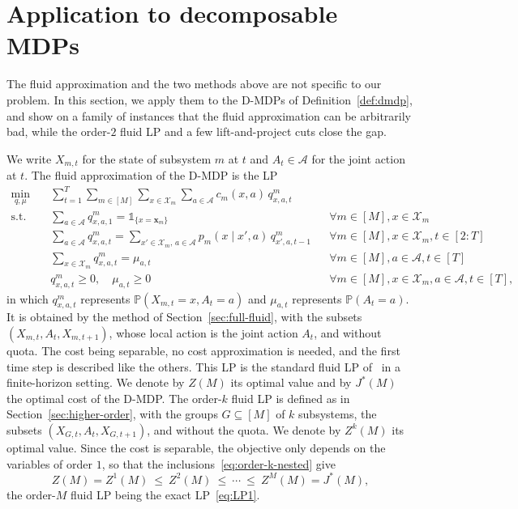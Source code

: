 \documentclass{article}
\begin{document}
\section{Application to decomposable MDPs}
\label{sec:dmdp}
The fluid approximation and the two methods above are not specific to our problem. In this section, we apply them to
the D-MDPs of Definition~\ref{def:dmdp}, and show on a family of instances that the fluid approximation can be
arbitrarily bad, while the order-$2$ fluid LP and a few lift-and-project cuts close the gap.

We write $X_{m,t}$ for the state of subsystem $m$ at $t$ and $A_t \in \mathcal{A}$ for the joint action at $t$. The
fluid approximation of the D-MDP is the LP
\begin{subequations}\label{eq:dmdp-fluid}
\begin{align}
\min_{q,\mu} \quad
& \sum_{t=1}^{T} \sum_{m \in [M]} \sum_{x \in \mathcal{X}_m} \sum_{a \in \mathcal{A}} c_m(x,a)\, q^m_{x,a,t}
\label{eq:dmdp-fluid-obj}\\
\text{s.t.} \quad
& \sum_{a \in \mathcal{A}} q^m_{x,a,1} = \mathds{1}_{\{x = \mathbf{x}_m\}}
&& \forall m \in [M], x \in \mathcal{X}_m
\label{eq:dmdp-fluid-initial}\\
& \sum_{a \in \mathcal{A}} q^m_{x,a,t} = \sum_{x' \in \mathcal{X}_m,\, a \in \mathcal{A}} p_m(x \mid x', a)\,
q^m_{x',a,t-1}
&& \forall m \in [M], x \in \mathcal{X}_m, t \in [2:T]
\label{eq:dmdp-fluid-flow}\\
& \sum_{x \in \mathcal{X}_m} q^m_{x,a,t} = \mu_{a,t}
&& \forall m \in [M], a \in \mathcal{A}, t \in [T]
\label{eq:dmdp-fluid-consistency}\\
& q^m_{x,a,t} \ge 0, \quad \mu_{a,t} \ge 0
&& \forall m \in [M], x \in \mathcal{X}_m, a \in \mathcal{A}, t \in [T],
\label{eq:dmdp-fluid-nonneg}
\end{align}
\end{subequations}
in which $q^m_{x,a,t}$ represents $\mathbb{P}(X_{m,t} = x, A_t = a)$ and $\mu_{a,t}$ represents $\mathbb{P}(A_t = a)$.
It is obtained by the method of Section~\ref{sec:full-fluid}, with the subsets $(X_{m,t}, A_t, X_{m,t+1})$, whose
local action is the joint action $A_t$, and without quota. The cost being separable, no cost approximation is
needed, and the first time step is described like the others.
This LP is the standard fluid LP of~\cite{bertsimas2016} in a finite-horizon setting. We denote by $Z(M)$ its
optimal value and by $J^*(M)$ the optimal cost of the D-MDP. The order-$k$ fluid LP is defined as in
Section~\ref{sec:higher-order}, with the groups $G \subseteq [M]$ of $k$ subsystems, the subsets
$(X_{G,t}, A_t, X_{G,t+1})$, and without the quota. We denote by $Z^k(M)$ its optimal value. Since the cost is
separable, the objective only depends on the variables of order $1$, so that the inclusions~\eqref{eq:order-k-nested}
give
\[
Z(M) = Z^1(M) \ \leq\ Z^2(M) \ \leq\ \cdots\ \leq\ Z^M(M) = J^*(M),
\]
the order-$M$ fluid LP being the exact LP~\eqref{eq:LP1}.
\end{document}
